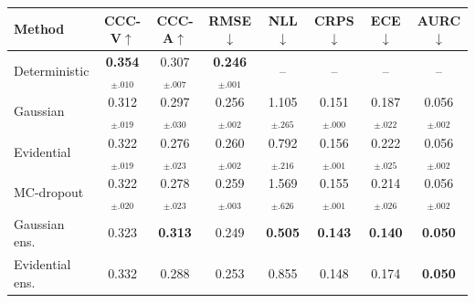 \begin{tabular}{lccccccc}
\toprule
Method & CCC-V$\uparrow$ & CCC-A$\uparrow$ & RMSE$\downarrow$ & NLL$\downarrow$ & CRPS$\downarrow$ & ECE$\downarrow$ & AURC$\downarrow$ \\
\midrule
Deterministic & \textbf{0.354}$_{\pm.010}$ & 0.307$_{\pm.007}$ & \textbf{0.246}$_{\pm.001}$ & -- & -- & -- & -- \\
Gaussian & 0.312$_{\pm.019}$ & 0.297$_{\pm.030}$ & 0.256$_{\pm.002}$ & 1.105$_{\pm.265}$ & 0.151$_{\pm.000}$ & 0.187$_{\pm.022}$ & 0.056$_{\pm.002}$ \\
Evidential & 0.322$_{\pm.019}$ & 0.276$_{\pm.023}$ & 0.260$_{\pm.002}$ & 0.792$_{\pm.216}$ & 0.156$_{\pm.001}$ & 0.222$_{\pm.025}$ & 0.056$_{\pm.002}$ \\
MC-dropout & 0.322$_{\pm.020}$ & 0.278$_{\pm.023}$ & 0.259$_{\pm.003}$ & 1.569$_{\pm.626}$ & 0.155$_{\pm.001}$ & 0.214$_{\pm.026}$ & 0.056$_{\pm.002}$ \\
Gaussian ens. & 0.323 & \textbf{0.313} & 0.249 & \textbf{0.505} & \textbf{0.143} & \textbf{0.140} & \textbf{0.050} \\
Evidential ens. & 0.332 & 0.288 & 0.253 & 0.855 & 0.148 & 0.174 & \textbf{0.050} \\
\bottomrule
\end{tabular}
